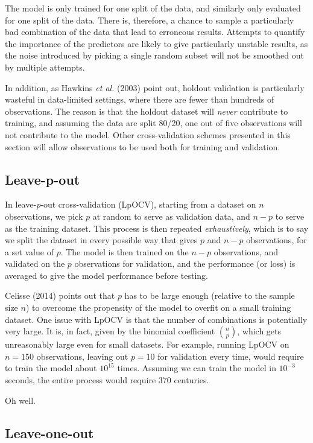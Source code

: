 \documentclass[
  letterpaper,
]{scrbook}
\begin{document}
The model is only trained for one split of the data, and similarly only
evaluated for one split of the data. There is, therefore, a chance to
sample a particularly bad combination of the data that lead to erroneous
results. Attempts to quantify the importance of the predictors are
likely to give particularly unstable results, as the noise introduced by
picking a single random subset will not be smoothed out by multiple
attempts.

In addition, as Hawkins \emph{et al.} (2003) point out, holdout
validation is particularly wasteful in data-limited settings, where
there are fewer than hundreds of observations. The reason is that the
holdout dataset will \emph{never} contribute to training, and assuming
the data are split 80/20, one out of five observations will not
contribute to the model. Other cross-validation schemes presented in
this section will allow observations to be used both for training and
validation.

\subsection{Leave-p-out}\label{leave-p-out}

In leave-\emph{p}-out cross-validation (LpOCV), starting from a dataset
on \(n\) observations, we pick \(p\) at random to serve as validation
data, and \(n-p\) to serve as the training dataset. This process is then
repeated \emph{exhaustively}, which is to say we split the dataset in
every possible way that gives \(p\) and \(n-p\) observations, for a set
value of \(p\). The model is then trained on the \(n-p\) observations,
and validated on the \(p\) observations for validation, and the
performance (or loss) is averaged to give the model performance before
testing.

Celisse (2014) points out that \(p\) has to be large enough (relative to
the sample size \(n\)) to overcome the propensity of the model to
overfit on a small training dataset. One issue with LpOCV is that the
number of combinations is potentially very large. It is, in fact, given
by the binomial coefficient \(\binom{n}{p}\), which gets unreasonably
large even for small datasets. For example, running LpOCV on \(n=150\)
observations, leaving out \(p=10\) for validation every time, would
require to train the model about \(10^{15}\) times. Assuming we can
train the model in \(10^{-3}\) seconds, the entire process would require
370 centuries.

Oh well.

\subsection{Leave-one-out}\label{leave-one-out}
\end{document}
